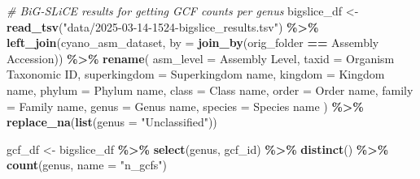 \documentclass[
]{article}
\newenvironment{Shaded}{\begin{snugshade}}{\end{snugshade}}
\newcommand{\AttributeTok}[1]{\textcolor[rgb]{0.13,0.29,0.53}{#1}}
\newcommand{\CommentTok}[1]{\textcolor[rgb]{0.56,0.35,0.01}{\textit{#1}}}
\newcommand{\FunctionTok}[1]{\textcolor[rgb]{0.13,0.29,0.53}{\textbf{#1}}}
\newcommand{\NormalTok}[1]{#1}
\newcommand{\OtherTok}[1]{\textcolor[rgb]{0.56,0.35,0.01}{#1}}
\newcommand{\SpecialCharTok}[1]{\textcolor[rgb]{0.81,0.36,0.00}{\textbf{#1}}}
\newcommand{\StringTok}[1]{\textcolor[rgb]{0.31,0.60,0.02}{#1}}
\begin{document}
\begin{Shaded}
\begin{Highlighting}[]
\CommentTok{\# BiG{-}SLiCE results for getting GCF counts per genus}
\NormalTok{bigslice\_df }\OtherTok{\textless{}{-}} \FunctionTok{read\_tsv}\NormalTok{(}\StringTok{"data/2025{-}03{-}14{-}1524{-}bigslice\_results.tsv"}\NormalTok{) }\SpecialCharTok{\%\textgreater{}\%} 
    \FunctionTok{left\_join}\NormalTok{(cyano\_asm\_dataset, }\AttributeTok{by =} \FunctionTok{join\_by}\NormalTok{(}\StringTok{\textquotesingle{}orig\_folder\textquotesingle{}} \SpecialCharTok{==} \StringTok{\textquotesingle{}Assembly Accession\textquotesingle{}}\NormalTok{)) }\SpecialCharTok{\%\textgreater{}\%}
    \FunctionTok{rename}\NormalTok{(}
        \StringTok{\textquotesingle{}asm\_level\textquotesingle{}} \OtherTok{=} \StringTok{\textasciigrave{}}\AttributeTok{Assembly Level}\StringTok{\textasciigrave{}}\NormalTok{, }
        \StringTok{\textquotesingle{}taxid\textquotesingle{}} \OtherTok{=} \StringTok{\textasciigrave{}}\AttributeTok{Organism Taxonomic ID}\StringTok{\textasciigrave{}}\NormalTok{, }
        \StringTok{\textquotesingle{}superkingdom\textquotesingle{}} \OtherTok{=} \StringTok{\textasciigrave{}}\AttributeTok{Superkingdom name}\StringTok{\textasciigrave{}}\NormalTok{, }
        \StringTok{\textquotesingle{}kingdom\textquotesingle{}} \OtherTok{=} \StringTok{\textasciigrave{}}\AttributeTok{Kingdom name}\StringTok{\textasciigrave{}}\NormalTok{, }
        \StringTok{\textquotesingle{}phylum\textquotesingle{}} \OtherTok{=} \StringTok{\textasciigrave{}}\AttributeTok{Phylum name}\StringTok{\textasciigrave{}}\NormalTok{, }
        \StringTok{\textquotesingle{}class\textquotesingle{}} \OtherTok{=} \StringTok{\textasciigrave{}}\AttributeTok{Class name}\StringTok{\textasciigrave{}}\NormalTok{, }
        \StringTok{\textquotesingle{}order\textquotesingle{}} \OtherTok{=} \StringTok{\textasciigrave{}}\AttributeTok{Order name}\StringTok{\textasciigrave{}}\NormalTok{, }
        \StringTok{\textquotesingle{}family\textquotesingle{}} \OtherTok{=} \StringTok{\textasciigrave{}}\AttributeTok{Family name}\StringTok{\textasciigrave{}}\NormalTok{, }
        \StringTok{\textquotesingle{}genus\textquotesingle{}} \OtherTok{=} \StringTok{\textasciigrave{}}\AttributeTok{Genus name}\StringTok{\textasciigrave{}}\NormalTok{, }
        \StringTok{\textquotesingle{}species\textquotesingle{}} \OtherTok{=} \StringTok{\textasciigrave{}}\AttributeTok{Species name}\StringTok{\textasciigrave{}}
\NormalTok{    ) }\SpecialCharTok{\%\textgreater{}\%}
    \FunctionTok{replace\_na}\NormalTok{(}\FunctionTok{list}\NormalTok{(}\AttributeTok{genus =} \StringTok{"Unclassified"}\NormalTok{))}

\NormalTok{gcf\_df }\OtherTok{\textless{}{-}}\NormalTok{ bigslice\_df }\SpecialCharTok{\%\textgreater{}\%} \FunctionTok{select}\NormalTok{(genus, gcf\_id) }\SpecialCharTok{\%\textgreater{}\%} \FunctionTok{distinct}\NormalTok{() }\SpecialCharTok{\%\textgreater{}\%} \FunctionTok{count}\NormalTok{(genus, }\AttributeTok{name =} \StringTok{"n\_gcfs"}\NormalTok{)}
\end{Highlighting}
\end{Shaded}
\end{document}

